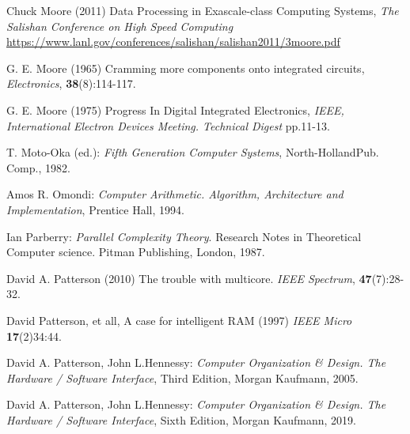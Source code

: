 {\begin{thebibliography}{}

 Chuck Moore (2011) Data Processing in Exascale-class Computing Systems, {\em The Salishan Conference on
High Speed Computing} \url{https://www.lanl.gov/conferences/salishan/salishan2011/3moore.pdf}


 G. E. Moore (1965) Cramming more components onto integrated circuits, {\em Electronics}, {\bf 38}(8):114-117. %

 G. E. Moore (1975) Progress In Digital Integrated Electronics,  {\em IEEE, International Electron Devices Meeting. Technical Digest} pp.11-13.


 T. Moto-Oka (ed.): {\em Fifth Generation Computer Systems}, North-HollandPub. Comp., 1982.


 Amos R. Omondi: {\em Computer Arithmetic. Algorithm, Architecture and Implementation}, Prentice Hall, 1994.


 Ian Parberry: {\em Parallel Complexity Theory}. Research Notes in Theoretical Computer science. Pitman Publishing, London, 1987.


 David A. Patterson (2010) The trouble with multicore. {\em IEEE Spectrum}, {\bf 47}(7):28-32.


 David Patterson, et all, A case for intelligent RAM (1997) {\em  IEEE Micro} {\bf 17}(2)34:44.

 David A. Patterson, John L.Hennessy: {\em Computer Organization \& Design. The Hardware / Software Interface}, Third Edition, Morgan Kaufmann, 2005.

 David A. Patterson, John L.Hennessy: {\em Computer Organization \& Design. The Hardware / Software Interface}, Sixth Edition, Morgan Kaufmann, 2019.


\end{thebibliography}}
